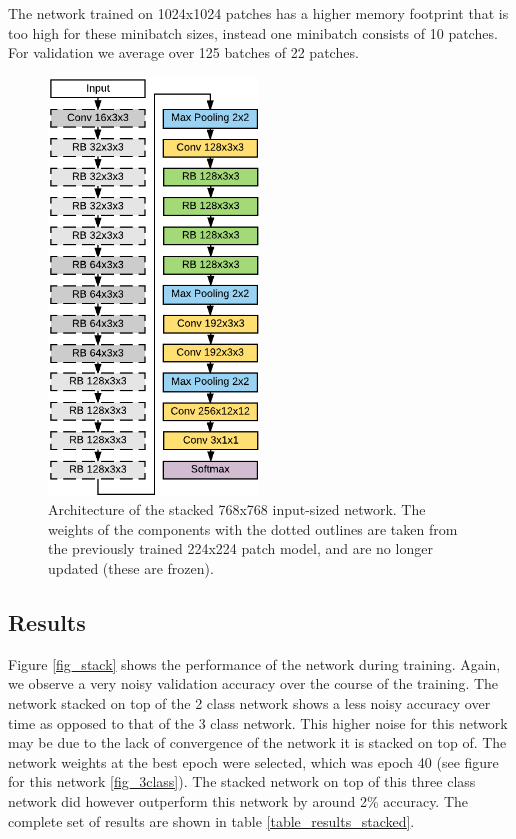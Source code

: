 \documentclass[journal]{IEEEtran}
\begin{document}
The network trained on 1024x1024 patches has a higher memory footprint that is too high for these minibatch sizes, instead one minibatch consists of 10 patches. For validation we average over 125 batches of 22 patches.

\begin{figure}[!t]
\centering{}
\includegraphics[width=2.2in]{architecture_stacked}
\vspace{-0.15cm}\caption{Architecture of the stacked 768x768 input-sized network. The weights of the components with the dotted outlines are taken from the previously trained 224x224 patch model, and are no longer updated (these are frozen).}
\label{fig_stacked}
\end{figure}

\subsection{Results}



Figure \ref{fig_stack} shows the performance of the network during training. Again, we observe a very noisy validation accuracy over the course of the training. The network stacked on top of the 2 class network shows a less noisy accuracy over time as opposed to that of the 3 class network. This higher noise for this network may be due to the lack of convergence of the network it is stacked on top of. The network weights at the best epoch were selected, which was epoch 40 (see figure for this network \ref{fig_3class}). The stacked network on top of this three class network did however outperform this network by around 2\% accuracy. The complete set of results are shown in table \ref{table_results_stacked}. 
\end{document}
